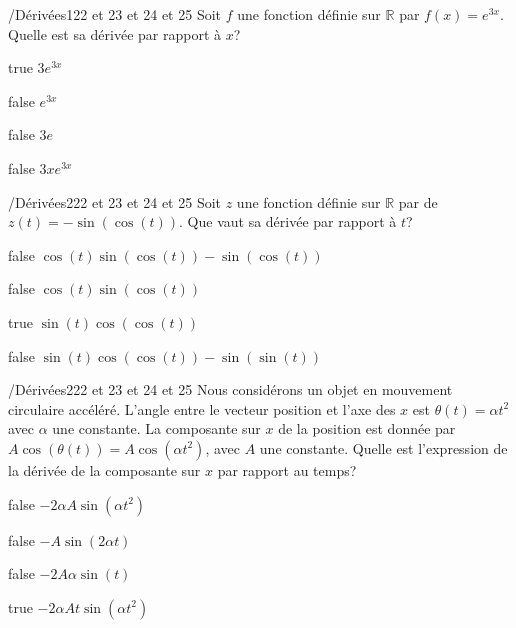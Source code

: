         	\begin{question}{/}{Dérivées}{1}{22 et 23 et 24 et 25}
				Soit $f$ une fonction définie sur $\mathbb{R}$ par $f(x)=e^{3x}$. Quelle est sa dérivée par rapport à $x$?
            \end{question}
            \begin{reponses}
            	\item[true] $3e^{3x}$
            	\item[false] $e^{3x}$
                \item[false] $3e$
                \item[false] $3xe^{3x}$
            \end{reponses}
            \begin{question}{/}{Dérivées}{2}{22 et 23 et 24 et 25}
                Soit $z$ une fonction définie sur $\mathbb{R}$ par de $z(t)=-\sin(\cos(t))$. Que vaut sa dérivée par rapport à $t$?
            \end{question}
            \begin{reponses}
                \item[false] $\cos(t)\sin(\cos(t))-\sin(\cos(t))$
                \item[false] $\cos(t)\sin(\cos(t))$
                \item[true] $\sin(t)\cos(\cos(t))$
                \item[false] $\sin(t)\cos(\cos(t))-\sin(\sin(t))$
            \end{reponses}
            \begin{question}{/}{Dérivées}{2}{22 et 23 et 24 et 25}
                Nous considérons un objet en mouvement circulaire accéléré. L'angle entre le vecteur position et l'axe des $x$ est $\theta(t)=\alpha t^2$ avec $\alpha$ une constante. La composante sur $x$ de la position est donnée par \mbox{$A\cos(\theta(t))=A\cos(\alpha t^2)$}, avec $A$ une constante. Quelle est l'expression de la dérivée de la composante sur $x$ par rapport au temps?
            \end{question}
            \begin{reponses}
                \item[false] $-2\alpha A\sin(\alpha t^2)$
                \item[false] $-A\sin(2\alpha t)$
                \item[false] $-2A\alpha\sin(t)$
                \item[true] $-2\alpha At\sin(\alpha t^2)$
            \end{reponses}
